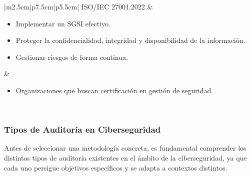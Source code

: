 \documentclass[a4paper, 11pt]{article}
\begin{document}
\begin{table}[H]
\begin{tabular}{|m{2.5cm}|p{7.5cm}|p{5.5cm}|}
ISO/IEC 27001:2022 &
\begin{minipage}[c]{\linewidth}
\begin{itemize} \par\vspace{0.1cm}
  \item Implementar un SGSI efectivo.    
  \item Proteger la confidencialidad, integridad y disponibilidad de la información.
  \item Gestionar riesgos de forma continua.    \par\vspace{0.1cm}

\end{itemize}
\end{minipage} &
\begin{minipage}[c]{\linewidth}
\begin{itemize}
  \item Organizaciones que buscan certificación en gestión de seguridad.
\end{itemize}
\end{minipage} \\ \hline

\end{tabular}
\caption{Comparativa de normativas y estándares en ciberseguridad.}
\label{tabla:normativas}
\end{table}



\subsubsection{Tipos de Auditoría en Ciberseguridad}

Antes de seleccionar una metodología concreta, es fundamental comprender los distintos tipos de auditoría existentes en el ámbito de la ciberseguridad, ya que cada uno persigue objetivos específicos y se adapta a contextos distintos.
\end{document}
